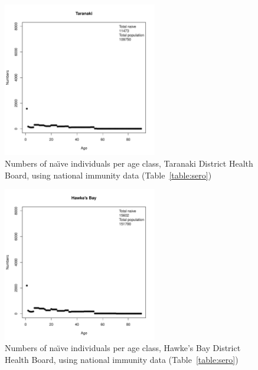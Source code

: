 \documentclass{article}
\begin{document}
\begin{itemize}
\begin{figure}[H]
  \begin{center}
    \includegraphics[width=0.6\textwidth]{dhb9.pdf}
     \end{center}
     \caption{Numbers of na\"{\i}ve individuals per age class, Taranaki District Health Board, using national immunity data (Table~\ref{table:sero})}
     \label{fig:Taranaki}
\end{figure}

\begin{figure}[H]
     \begin{center}
     \includegraphics[width=0.6\textwidth]{dhb10.pdf}
     \end{center}
     \caption{Numbers of na\"{\i}ve individuals per age class, Hawke's Bay District Health Board, using national immunity data (Table~\ref{table:sero})}
     \label{fig:HawkesBay}
\end{figure}


\end{itemize}
\end{document}
